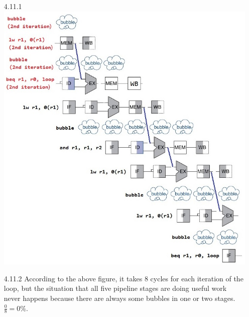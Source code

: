 \documentclass[12pt, a4paper]{article}
\begin{document}
\begin{itemize}[font=\bfseries]
\newpage
\item[4.11.1]
\hspace*{0cm} \\
\includegraphics[scale = 0.75]{3_2.JPG}
\item[4.11.2]
According to the above figure, it takes 8 cycles for each iteration of the loop, but the situation that all five pipeline stages are doing useful work never happens because there are always some bubbles in one or two stages. $\displaystyle \frac{0}{8} = 0\%$.


\end{itemize}
\end{document}
